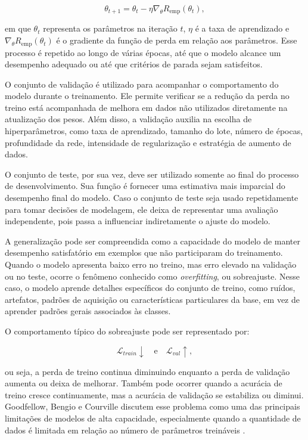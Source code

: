 \documentclass[
    12pt,
    openright,
    oneside,
    a4paper,
    english,
    brazil
]{abntex2}
\begin{document}
\[
\theta_{t+1}
=
\theta_t
-
\eta
\nabla_{\theta}
R_{\text{emp}}(\theta_t),
\]

em que \(\theta_t\) representa os parâmetros na iteração \(t\), \(\eta\) é a taxa de aprendizado e \(\nabla_{\theta}R_{\text{emp}}(\theta_t)\) é o gradiente da função de perda em relação aos parâmetros. Esse processo é repetido ao longo de várias épocas, até que o modelo alcance um desempenho adequado ou até que critérios de parada sejam satisfeitos.

O conjunto de validação é utilizado para acompanhar o comportamento do modelo durante o treinamento. Ele permite verificar se a redução da perda no treino está acompanhada de melhora em dados não utilizados diretamente na atualização dos pesos. Além disso, a validação auxilia na escolha de hiperparâmetros, como taxa de aprendizado, tamanho do lote, número de épocas, profundidade da rede, intensidade de regularização e estratégia de aumento de dados.

O conjunto de teste, por sua vez, deve ser utilizado somente ao final do processo de desenvolvimento. Sua função é fornecer uma estimativa mais imparcial do desempenho final do modelo. Caso o conjunto de teste seja usado repetidamente para tomar decisões de modelagem, ele deixa de representar uma avaliação independente, pois passa a influenciar indiretamente o ajuste do modelo.

A generalização pode ser compreendida como a capacidade do modelo de manter desempenho satisfatório em exemplos que não participaram do treinamento. Quando o modelo apresenta baixo erro no treino, mas erro elevado na validação ou no teste, ocorre o fenômeno conhecido como \textit{overfitting}, ou sobreajuste. Nesse caso, o modelo aprende detalhes específicos do conjunto de treino, como ruídos, artefatos, padrões de aquisição ou características particulares da base, em vez de aprender padrões gerais associados às classes.

O comportamento típico do sobreajuste pode ser representado por:

\[
\mathcal{L}_{train} \downarrow
\quad \text{e} \quad
\mathcal{L}_{val} \uparrow,
\]

ou seja, a perda de treino continua diminuindo enquanto a perda de validação aumenta ou deixa de melhorar. Também pode ocorrer quando a acurácia de treino cresce continuamente, mas a acurácia de validação se estabiliza ou diminui. Goodfellow, Bengio e Courville discutem esse problema como uma das principais limitações de modelos de alta capacidade, especialmente quando a quantidade de dados é limitada em relação ao número de parâmetros treináveis \cite{goodfellow2016deep}.
\end{document}
